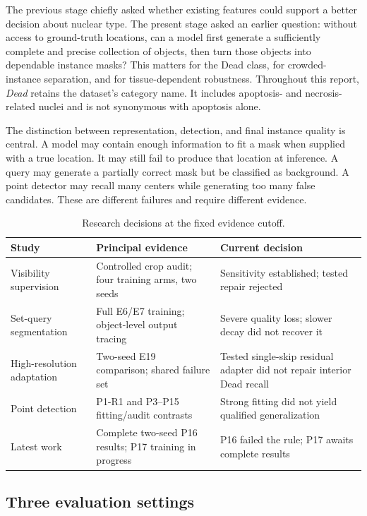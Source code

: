 \documentclass[11pt,a4paper]{article}
\begin{document}
The previous stage chiefly asked whether existing features could support a better decision about nuclear type. The present stage asked an earlier question: without access to ground-truth locations, can a model first generate a sufficiently complete and precise collection of objects, then turn those objects into dependable instance masks? This matters for the Dead class, for crowded-instance separation, and for tissue-dependent robustness. Throughout this report, \emph{Dead} retains the dataset's category name. It includes apoptosis- and necrosis-related nuclei and is not synonymous with apoptosis alone.

The distinction between representation, detection, and final instance quality is central. A model may contain enough information to fit a mask when supplied with a true location. It may still fail to produce that location at inference. A query may generate a partially correct mask but be classified as background. A point detector may recall many centers while generating too many false candidates. These are different failures and require different evidence.

\begin{table}[H]\centering\small
\begin{tabularx}{\linewidth}{p{28mm}XX}
\toprule Study & Principal evidence & Current decision\\\midrule
Visibility supervision & Controlled crop audit; four training arms, two seeds & Sensitivity established; tested repair rejected\\
Set-query segmentation & Full E6/E7 training; object-level output tracing & Severe quality loss; slower decay did not recover it\\
High-resolution adaptation & Two-seed E19 comparison; shared failure set & Tested single-skip residual adapter did not repair interior Dead recall\\
Point detection & P1-R1 and P3--P15 fitting/audit contrasts & Strong fitting did not yield qualified generalization\\
Latest work & Complete two-seed P16 results; P17 training in progress & P16 failed the rule; P17 awaits complete results\\
\bottomrule
\end{tabularx}
\caption{Research decisions at the fixed evidence cutoff.}
\end{table}

\subsection{Three evaluation settings}
\end{document}
